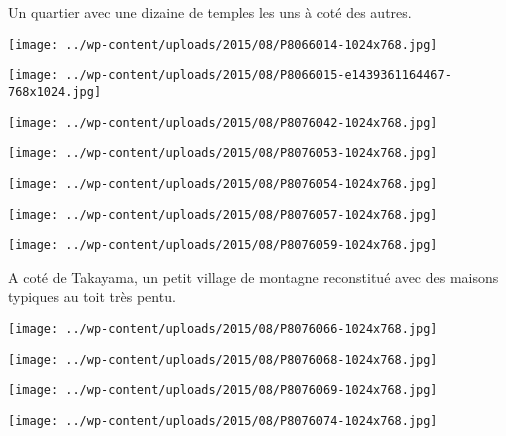  \newline
 Un quartier avec une dizaine de temples les uns à coté des autres. \newline
 \newline
\centerline{\texttt{[image: ../wp-content/uploads/2015/08/P8066014-1024x768.jpg]} } 
 \newline
 \newline
\centerline{\texttt{[image: ../wp-content/uploads/2015/08/P8066015-e1439361164467-768x1024.jpg]} } 
 \newline
 \newline
\centerline{\texttt{[image: ../wp-content/uploads/2015/08/P8076042-1024x768.jpg]} } 
 \newline
 \newline
\centerline{\texttt{[image: ../wp-content/uploads/2015/08/P8076053-1024x768.jpg]} } 
 \newline
 \newline
\centerline{\texttt{[image: ../wp-content/uploads/2015/08/P8076054-1024x768.jpg]} } 
 \newline
 \newline
\centerline{\texttt{[image: ../wp-content/uploads/2015/08/P8076057-1024x768.jpg]} } 
 \newline
 \newline
\centerline{\texttt{[image: ../wp-content/uploads/2015/08/P8076059-1024x768.jpg]} } 
 \newline
 A coté de Takayama, un petit village de montagne reconstitué avec des maisons typiques au toit très pentu. \newline
 \newline
\centerline{\texttt{[image: ../wp-content/uploads/2015/08/P8076066-1024x768.jpg]} } 
 \newline
 \newline
\centerline{\texttt{[image: ../wp-content/uploads/2015/08/P8076068-1024x768.jpg]} } 
 \newline
 \newline
\centerline{\texttt{[image: ../wp-content/uploads/2015/08/P8076069-1024x768.jpg]} } 
 \newline
 \newline
\centerline{\texttt{[image: ../wp-content/uploads/2015/08/P8076074-1024x768.jpg]} } 
 \newline
 \newline
